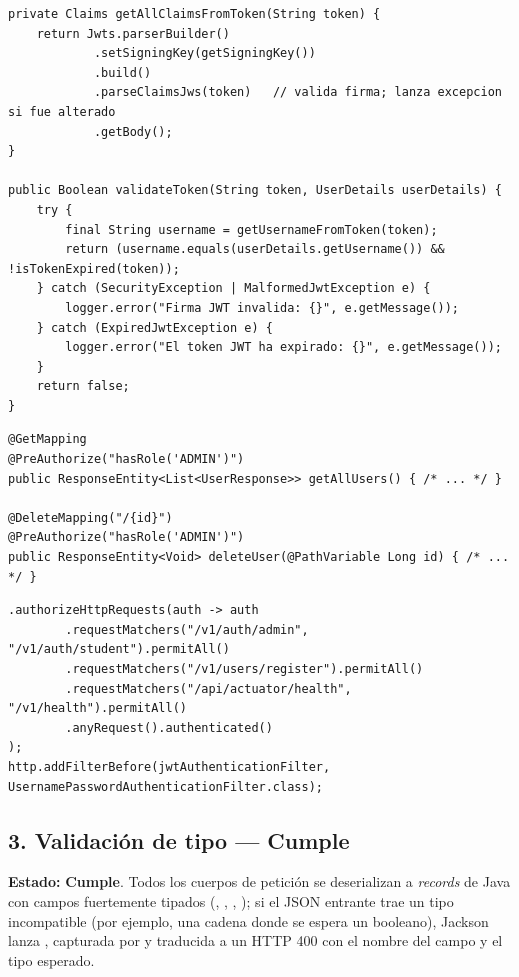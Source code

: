 \documentclass[11pt,a4paper]{article}
\newcommand{\Cumple}{\textcolor{cumpleColor}{\textbf{Cumple}}}
\begin{document}
\begin{lstlisting}[style=javastyle,caption={Verificación criptográfica de la firma y expiración del JWT (JwtUtil.java)}]
private Claims getAllClaimsFromToken(String token) {
    return Jwts.parserBuilder()
            .setSigningKey(getSigningKey())
            .build()
            .parseClaimsJws(token)   // valida firma; lanza excepcion si fue alterado
            .getBody();
}

public Boolean validateToken(String token, UserDetails userDetails) {
    try {
        final String username = getUsernameFromToken(token);
        return (username.equals(userDetails.getUsername()) && !isTokenExpired(token));
    } catch (SecurityException | MalformedJwtException e) {
        logger.error("Firma JWT invalida: {}", e.getMessage());
    } catch (ExpiredJwtException e) {
        logger.error("El token JWT ha expirado: {}", e.getMessage());
    }
    return false;
}
\end{lstlisting}

\begin{lstlisting}[style=javastyle,caption={Autorización por rol a nivel de método (UserController.java)}]
@GetMapping
@PreAuthorize("hasRole('ADMIN')")
public ResponseEntity<List<UserResponse>> getAllUsers() { /* ... */ }

@DeleteMapping("/{id}")
@PreAuthorize("hasRole('ADMIN')")
public ResponseEntity<Void> deleteUser(@PathVariable Long id) { /* ... */ }
\end{lstlisting}

\begin{lstlisting}[style=javastyle,caption={Reglas de autorización por ruta (SecurityConfig.java)}]
.authorizeHttpRequests(auth -> auth
        .requestMatchers("/v1/auth/admin", "/v1/auth/student").permitAll()
        .requestMatchers("/v1/users/register").permitAll()
        .requestMatchers("/api/actuator/health", "/v1/health").permitAll()
        .anyRequest().authenticated()
);
http.addFilterBefore(jwtAuthenticationFilter, UsernamePasswordAuthenticationFilter.class);
\end{lstlisting}

\subsection{3. Validación de tipo --- \Cumple}

\textbf{Estado:} \Cumple. Todos los cuerpos de petición se deserializan a \emph{records} de Java con campos fuertemente tipados (\texttt{}, \texttt{}, \texttt{}, \texttt{}); si el JSON entrante trae un tipo incompatible (por ejemplo, una cadena donde se espera un booleano), Jackson lanza \texttt{}, capturada por \texttt{} y traducida a un HTTP 400 con el nombre del campo y el tipo esperado.
\end{document}
